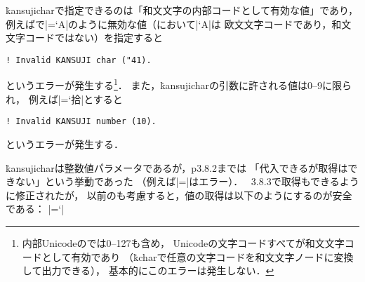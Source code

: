 \documentclass[a4paper,11pt,nomag,dvipdfmx]{jsarticle}
\begin{document}
\begin{dangerous}
  \.{kansujichar}で指定できるのは「和文文字の内部コードとして有効な値」であり，
  例えば\pTeX で|=`A|のように無効な値（\pTeX において|`A|は
  欧文文字コードであり，和文文字コードではない）を指定すると
\begin{verbatim}
! Invalid KANSUJI char ("41).
\end{verbatim}
  というエラーが発生する\footnote{内部Unicodeの\upTeX では0--127も含め，
  Unicodeの文字コードすべてが和文文字コードとして有効であり
  （\.{kchar}で任意の文字コードを和文文字ノードに変換して出力できる），
  基本的にこのエラーは発生しない．}．
  また，\.{kansujichar}の引数に許される値は0--9に限られ，
  例えば|=`拾|とすると
\begin{verbatim}
! Invalid KANSUJI number (10).
\end{verbatim}
  というエラーが発生する．
\end{dangerous}

\begin{dangerous}
  \.{kansujichar}は整数値パラメータであるが，p3.8.2までは
  「代入できるが取得はできない」という挙動であった
  （例えば|=|はエラー）．
  \pTeX~3.8.3で取得もできるように修正された\cite{tjb93}が，
  以前の\pTeX も考慮すると，値の取得は以下のようにするのが安全である：
  |=\expandafter`|
\end{dangerous}
\end{document}
